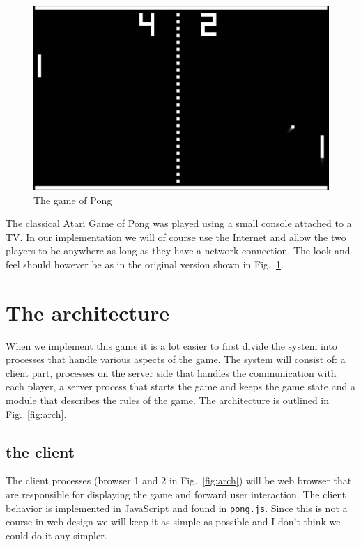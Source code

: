 \documentclass[a4paper,11pt]{article}
\begin{document}
\begin{figure}[t]
  \center 
  \includegraphics[scale=0.1]{pong.png}

  \caption{The game of Pong}
  \label{fig:pong}
\end{figure}

The classical Atari Game of Pong was played using a small console
attached to a TV. In our implementation we will of course use the
Internet and allow the two players to be anywhere as long as they have
a network connection. The look and feel should however be as in the
original version shown in Fig.~\ref{fig:pong}.

\section*{The architecture}
  
When we implement this game it is a lot easier to first divide the
system into processes that handle various aspects of the game. The
system will consist of: a client part, processes on the server side
that handles the communication with each player, a server process that
starts the game and keeps the game state and a module that describes
the rules of the game. The architecture is outlined in Fig.~\ref{fig:arch}. 

\subsection*{the client}

The client processes (browser 1 and 2 in Fig.~\ref{fig:arch}) will be
web browser that are responsible for displaying the game and forward
user interaction. The client behavior is implemented in JavaScript
and found in {\tt pong.js}. Since this is not a course in web design
we will keep it as simple as possible and I don't think we could do it
any simpler.
\end{document}
